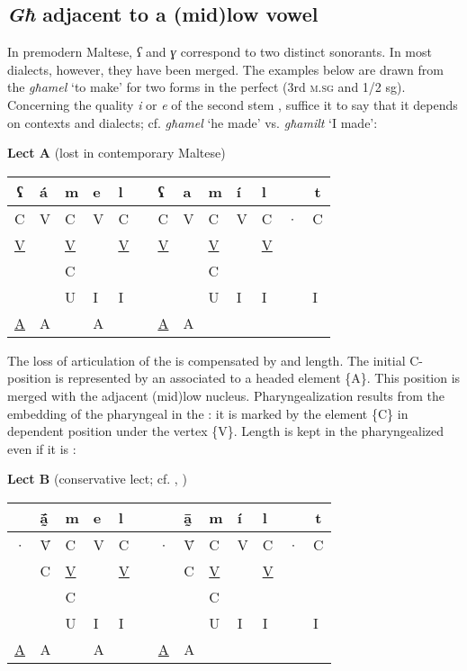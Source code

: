 \documentclass[output=paper]{langsci/langscibook}
\begin{document}
\subsection{\textit{Għ} adjacent to a (mid)low vowel}
In premodern Maltese, \textit{ʕ} and \textit{ɣ} correspond to two distinct sonorants. In most dialects, however, they have been merged. The examples below are drawn from the  \textit{għamel} ‘to make’ for two forms in the perfect (3rd \textsc{m.sg} and 1/2 sg). Concerning the quality \textit{i} or \textit{e} of the second stem , suffice it to say that it depends on contexts and dialects; cf. \textit{għamel} ‘he made’ vs. \textit{għamilt} ‘I made’:

\ea
\textbf{Lect A} (lost in contemporary Maltese)

\begin{tabular}{|lllll p{1cm} lllll l l|}
\multicolumn{1}{c}{ʕ} & á & m & e & l &&  ʕ & a&  m & í & l & & \multicolumn{1}{c}{t}\\
\hline
C & V & C & V & C &   & C & V & C & V & C & · & C\\
\underline{V} && \underline{V} && \underline{V} && \underline{V} && \underline{V} && \underline{V} & &\\
  &   & C &   &   &   &   &   & C &   &   &  & \\
 &    & U & I & I &   &   &   & U & I & I &  & I\\
\underline{A}
 & A  &   & A &   &   & \underline{A} & A &   &   &   &  & \\ 
 \hline
\end{tabular}

\z

The loss of articulation of the  is compensated by  and length. The initial C-position is represented by an  associated to a headed element \{A\}. This position is merged with the adjacent (mid)low nucleus. Pharyngealization results from the embedding of the pharyngeal  in the : it is marked by the element \{C\} in dependent position under the vertex \{V\}. Length is kept in the pharyngealized  even if it is :

\ea %
\textbf{Lect B} (conservative lect; cf. \citealt{Aquilina1959}, \citealt{Schabert1976})
\begin{tabular}{|lllll p{1cm} lllllll|}
\multicolumn{1}{c}{}& {\'ā̰ } & m & e & l & & & ā̰ &  m & í & l & & \multicolumn{1}{c}{t}\\
\hline
 	·	&	\={V}	&	C	&	V	&	C	&&	·	&	\={V}	&	C	&	V	&	C	&	·	&	C \\
		&	C	&\underline{V}	&		&\underline{V}	&&		&	C	&\underline{V}	&		&\underline{V}	&		&	\\
		&		&	C	&		&		&&		&		&	C	&		&		&		&	\\
		&		&	U	&	I	&	I	&&		&		&	U	&	I	&	I	&		&	I \\
\underline{A}	&	A	&		&	A	&		&&\underline{A}	&	A	&		&		&		&		&	\\
\hline	
\end{tabular}
\z
\end{document}
